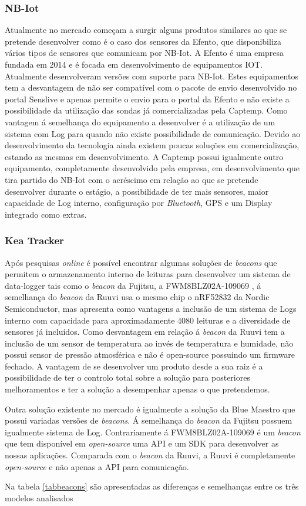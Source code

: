 \subsubsection{NB-Iot}
\par
Atualmente no mercado começam a surgir alguns produtos similares ao que se pretende desenvolver como é o caso dos sensores da Efento\cite{epoka}, que disponibiliza vários tipos de sensores que comunicam por NB-Iot. A Efento é uma empresa fundada em 2014 e é focada em desenvolvimento de equipamentos IOT. Atualmente desenvolveram versões com suporte para NB-Iot. Estes equipamentos tem a desvantagem de não ser compatível com o pacote de envio desenvolvido no portal Senslive e apenas permite o envio para o portal da Efento e não existe a possibilidade da utilização das sondas já comercializadas pela Captemp. Como vantagem á semelhança do equipamento a desenvolver é a utilização de um sistema com Log para quando não existe possibilidade de comunicação.
Devido ao desenvolvimento da tecnologia ainda existem poucas soluções em comercialização, estando as mesmas em desenvolvimento. A Captemp possui igualmente outro equipamento, completamente desenvolvido pela empresa, em desenvolvimento que tira partido do NB-Iot com o acréscimo em relação ao que se pretende desenvolver durante o estágio, a possibilidade de ter mais sensores, maior capacidade de Log interno, configuração por \textit{Bluetooth}, GPS e um Display integrado como extras.


\subsubsection{Kea Tracker}
Após pesquisas \textit{online} é possível encontrar algumas soluções de \textit{beacons} que permitem o armazenamento interno de leituras para desenvolver um sistema de data-logger tais como o \textit{beacon} da Fujitsu, a FWM8BLZ02A-109069\cite{beacon1} , á semelhança do \textit{beacon} da Ruuvi usa o mesmo chip o nRF52832 da Nordic Semiconductor, mas apresenta como vantagens a inclusão de um sistema de Logs interno com capacidade para aproximadamente 4080 leituras e a diversidade de sensores já incluídos. Como desvantagem em relação á \textit{beacon} da Ruuvi tem a inclusão de um sensor de temperatura ao invés de temperatura e humidade, não possui sensor de pressão atmosférica e não é open-source possuindo um firmware fechado. A vantagem de se desenvolver um produto desde a sua raiz é a possibilidade de ter o controlo total sobre a solução para posteriores melhoramentos e ter a solução a desempenhar apenas o que pretendemos.
\par
Outra solução existente no mercado é igualmente a solução da Blue Maestro que possui variadas versões de \textit{beacons}. Á semelhança do \textit{beacon} da Fujitsu possuem igualmente sistema de Log. Contrariamente á FWM8BLZ02A-109069 é um \textit{beacon} que tem disponível em \textit{open-source} uma API e um SDK para desenvolver as nossas aplicações. Comparada com o \textit{beacon} da Ruuvi, a Ruuvi é completamente \textit{open-source} e não apenas a API para comunicação.
\par
Na tabela \ref{tabbeacons} são apresentadas as diferenças e semelhanças entre os três modelos analisados

